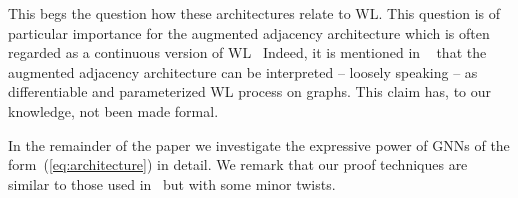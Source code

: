 This begs the question how these architectures relate to WL. This question is of particular importance for the augmented adjacency architecture which is often regarded as a continuous version of WL~\cite{kipf-loose}
Indeed, it is mentioned in ~\cite{kipf-loose} that the augmented adjacency architecture can be interpreted -- loosely speaking -- as differentiable and parameterized WL process on graphs. This claim has, to our knowledge, not been made formal.




In the remainder of the paper we investigate the expressive power of GNNs of the form~(\ref{eq:architecture}) in detail. We remark that our proof techniques are similar to those used in~\cite{grohewl} but with some minor twists.




